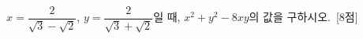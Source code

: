 $x=\dfrac{2}{\sqrt{3}-\sqrt{2}}$, $y=\dfrac{2}{\sqrt{3}+\sqrt{2}}$일 때, $x^2+y^2-8xy$의 값을 구하시오.~\mbox{\mbox{[8점]}}
